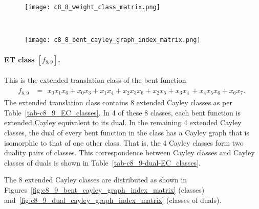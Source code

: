 \documentclass[12pt,a4paper]{article}
\begin{document}
\begin{figure}[!bhpt] %
\centering
\begin{minipage}{.48\textwidth}
  \centering
  \texttt{[image: c8\_8\_weight\_class\_matrix.png]}
  \label{fig:c8_8_weight_class_matrix}
\end{minipage}%
~~~~
\begin{minipage}{.48\textwidth}
  \centering
  \texttt{[image: c8\_8\_bent\_cayley\_graph\_index\_matrix.png]}
  \label{fig:c8_8_bent_cayley_graph_index_matrix}
\end{minipage}
\end{figure}

\paragraph*{ET class $[f_{8,9}]$.}
%
%
This is the extended translation class of the bent function
\small{}
\begin{align*}
f_{ 8 , 9 } &=
\begin{array}{l}
x_{0} x_{1} x_{6} + x_{0} x_{3} + x_{1} x_{4} + x_{2} x_{3} x_{6} + x_{2} x_{5} + x_{3} x_{4}\, +
x_{4} x_{5} x_{6} + x_{6} x_{7}.
\end{array}
\end{align*}
\normalsize{}
The extended translation class contains 8 extended Cayley classes as per Table~\ref{tab-c8_9_EC_classes}.
In 4 of these 8 classes, each bent function is extended Cayley equivalent to its dual.
In the remaining 4 extended Cayley classes, the dual of every bent function in the class has a Cayley graph
that is isomorphic to that of one other class. That is, the 4 Cayley classes form two duality pairs of classes.
This correspondence between Cayley classes and Cayley classes of duals is shown in Table~\ref{tab-c8_9-dual-EC_classes}.

The 8 extended Cayley classes are distributed
as shown in Figures~\ref{fig:c8_9_bent_cayley_graph_index_matrix} (classes) and~\ref{fig:c8_9_dual_cayley_graph_index_matrix}
(classes of duals).
\end{document}
